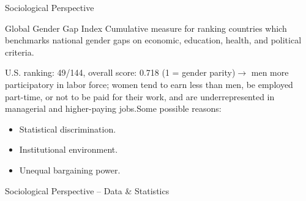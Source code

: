 \documentclass[usenames,dvipsnames]{beamer}
\begin{document}
    
    \begin{frame}{Sociological Perspective}
        \begin{block}{Global Gender Gap Index}
            Cumulative measure for ranking countries which benchmarks national gender gaps on economic, education, health, and political criteria.
        \end{block}
        U.S. ranking: 49/144, overall score: 0.718 (1 = gender parity)\newline $\rightarrow$ men more participatory in labor force; women tend to earn less than men, be employed part-time, or not to be paid for their work, and are underrepresented in managerial and higher-paying jobs.\newline\newline Some possible reasons:
        \begin{itemize}
            \item Statistical discrimination.
            \item Institutional environment.
            \item Unequal bargaining power.
        \end{itemize}
    \end{frame}
    
    
    \begin{frame}{Sociological Perspective -- Data \& Statistics}
        \begin{figure}
            \hfill
        \end{figure}
    \end{frame}
    
\end{document}
